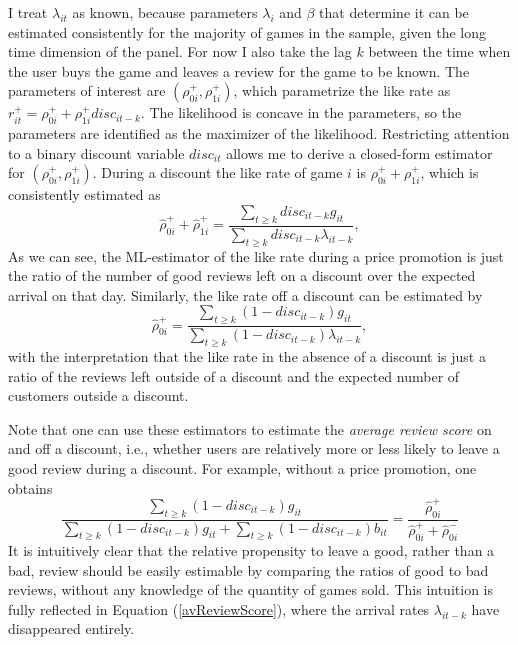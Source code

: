 \documentclass[
  12pt,
  pagebackref]{article}
\begin{document}
I treat \(\lambda_{it}\) as known, because parameters \(\lambda_{i}\)
and \(\beta\) that determine it can be estimated consistently for the
majority of games in the sample, given the long time dimension of the
panel. For now I also take the lag \(k\) between the time when the user
buys the game and leaves a review for the game to be known. The
parameters of interest are \((\rho_{0i}^+, \rho_{1i}^+)\), which
parametrize the like rate as
\(r_{it}^+ = \rho_{0i}^+ + \rho_{1i}^+ disc_{it-k}\). The likelihood is
concave in the parameters, so the parameters are identified as the
maximizer of the likelihood. Restricting attention to a binary discount
variable \(disc_{it}\) allows me to derive a closed-form estimator for
\((\rho_{0i}^+, \rho_{1i}^+)\). During a discount the like rate of game
\(i\) is \(\rho_{0i}^+ + \rho_{1i}^+\), which is consistently estimated
as \begin{equation}\label{rhohat1}
\hat \rho_{0i}^+ + \hat\rho_{1i}^+ = \frac{\sum_{t \ge k} disc_{it-k}g_{it}}{\sum_{t\ge k} disc_{it-k}\lambda_{it-k}},
\end{equation} As we can see, the ML-estimator of the like rate during a
price promotion is just the ratio of the number of good reviews left on
a discount over the expected arrival on that day. Similarly, the like
rate off a discount can be estimated by \begin{equation}\label{rhohat2}
\hat \rho_{0i}^+ = \frac{\sum_{t\ge k} (1-disc_{it-k})g_{it}}{\sum_{t\ge k} (1-disc_{it-k})\lambda_{it-k}},
\end{equation} with the interpretation that the like rate in the absence
of a discount is just a ratio of the reviews left outside of a discount
and the expected number of customers outside a discount.

Note that one can use these estimators to estimate the \emph{average
review score} on and off a discount, i.e., whether users are relatively
more or less likely to leave a good review during a discount. For
example, without a price promotion, one obtains
\begin{equation}\label{avReviewScore}
\frac{\sum_{t\ge k} (1-disc_{it-k})g_{it}}{\sum_{t\ge k} (1-disc_{it-k})g_{it} + \sum_{t\ge k} (1-disc_{it-k})b_{it}}
=
\frac{\hat \rho_{0i}^+}{\hat \rho_{0i}^+  + \hat \rho_{0i}^- }
\end{equation} It is intuitively clear that the relative propensity to
leave a good, rather than a bad, review should be easily estimable by
comparing the ratios of good to bad reviews, without any knowledge of
the quantity of games sold. This intuition is fully reflected in
Equation (\ref{avReviewScore}), where the arrival rates
\(\lambda_{it-k}\) have disappeared entirely.
\end{document}
